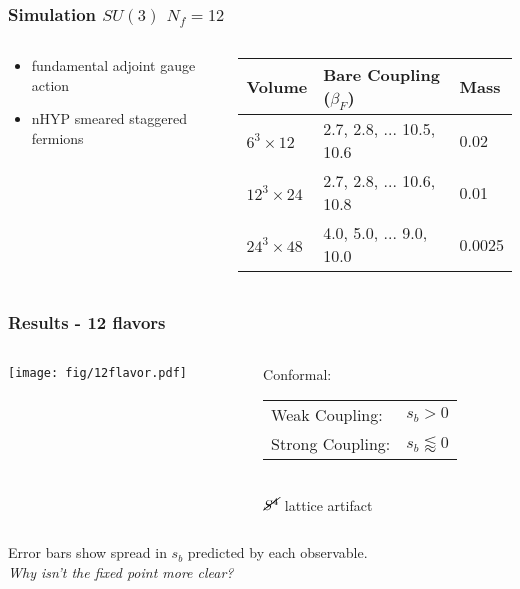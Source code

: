 \begin{frame}
  \frametitle{Simulation $SU(3)$ $N_f=12$}
  \begin{columns}[T]
    \begin{column}{0.3\textwidth}
      \begin{itemize}
        \item fundamental adjoint gauge action
        \item nHYP smeared staggered fermions
      \end{itemize}
    \end{column}
    \begin{column}{0.7\textwidth}
      \begin{center}
        \begin{tabular}{| l | l | l |}\hline
          Volume & Bare Coupling ($\beta_F$) & Mass \\\hline
          $6^3\times12$  & 2.7, 2.8, ... 10.5, 10.6 & 0.02\\
          $12^3\times24$ & 2.7, 2.8, ... 10.6, 10.8 & 0.01\\
          $24^3\times48$ & 4.0, 5.0, ... 9.0, 10.0 & 0.0025\\
          \hline
        \end{tabular}
      \end{center}
    \end{column}
  \end{columns}
\end{frame}

\begin{frame}
  \frametitle{Results - 12 flavors}
  \begin{columns}[T]
    \begin{column}{.6\textwidth}
      \texttt{[image: fig/12flavor.pdf]}
    \end{column}
    \begin{column}{.4\textwidth}
      Conformal:\\
      \vspace{12pt}
      \begin{tabular}{l l}
        Weak Coupling: & $s_b>0$ \\
        Strong Coupling: & $s_b\lessapprox0$\\
      \end{tabular}
      \newline\\
      \vspace{24pt}
      $\ensuremath{\cancel{S^4}}$ lattice artifact
    \end{column}
  \end{columns}
  \vspace{12pt}
  Error bars show spread in $s_b$ predicted by each observable.\\
  \vspace{12pt}
  \emph{Why isn't the fixed point more clear?}
\end{frame}

